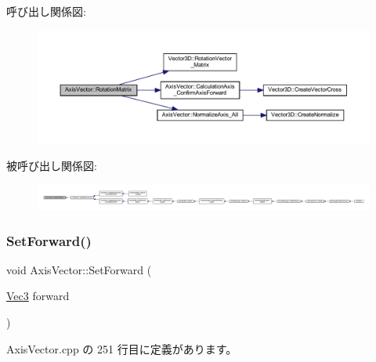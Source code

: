 呼び出し関係図\+:
\nopagebreak
\begin{figure}[H]
\begin{center}
\leavevmode
\includegraphics[width=350pt]{class_axis_vector_a33aab769ff2de997393c13414fa23873_cgraph}
\end{center}
\end{figure}
被呼び出し関係図\+:
\nopagebreak
\begin{figure}[H]
\begin{center}
\leavevmode
\includegraphics[width=350pt]{class_axis_vector_a33aab769ff2de997393c13414fa23873_icgraph}
\end{center}
\end{figure}
\mbox{\label{class_axis_vector_ac429404c0b565c24307da4442e49bb61}} 
\subsubsection{\texorpdfstring{Set\+Forward()}{SetForward()}}
{\footnotesize\ttfamily void Axis\+Vector\+::\+Set\+Forward (\begin{DoxyParamCaption}\item[{\mbox{\hyperlink{_vector3_d_8h_ab16f59e4393f29a01ec8b9bbbabbe65d}{Vec3}}}]{forward }\end{DoxyParamCaption})}



 Axis\+Vector.\+cpp の 251 行目に定義があります。

